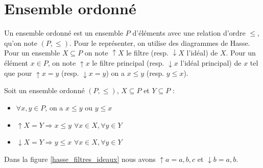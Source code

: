 \section{Ensemble ordonné}

Un ensemble ordonné est un ensemble $P$ d'éléments avec une relation d'ordre $\leq$, qu'on note $(P, \leq)$. Pour le représenter, on utilise des diagrammes de Hasse. Pour un ensemble $X \subseteq P$ on note $\uparrow \! X$ le filtre (resp. $\downarrow \! X$ l'idéal) de $X$. Pour un élément $x \in P$, on note $\uparrow \! x$ le filtre principal (resp. $\downarrow \! x$ l'idéal principal) de $x$ tel que pour $\uparrow \! x = {y}$ (resp. $\downarrow \! x = {y}$) on a $x \leq y$ (resp. $y \leq x$).

\begin{definition}
Soit un ensemble ordonné $(P, \leq)$, $X \subseteq P$ et $Y \subseteq P$ :
\begin{itemize}
	\item $\forall x, y \in P$, on a $x \leq y$ ou $y \leq x$
	\item $\uparrow \! X = Y \Rightarrow x \leq y$ $\forall x \in X, \forall y \in Y$
	\item $\downarrow \! X = Y \Rightarrow y \leq x$ $\forall x \in X, \forall y \in Y$
\end{itemize}
\end{definition}

Dans la figure \ref{hasse_filtres_ideaux} nous avons $\uparrow \! a = {a, b, c}$ et $\downarrow \! b = {a, b}$.

